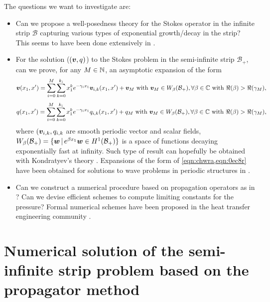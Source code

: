 \documentclass[a4paper,10pt,reqno]{amsart}
\begin{document}
The questions we want to investigate are:   
\begin{itemize}
    \item Can we propose a well-posedness theory for the Stokes operator in the
        infinite strip $\mathcal{B}$ capturing various types of exponential
        growth/decay in the strip? This seems to have been done extensively in
        \cite{nazarov_navier-stokes_2000-1}.    
    \item For the solution ($({\bm v},q)$) to the Stokes problem in the semi-infinite strip
        $\mathcal{B}_+$, can we prove, for any $M\in\mathbb{N}$, an asymptotic expansion of
        the form    
        \begin{equation}
        \label{eqn:chwra}
        {\bm v}(x_1,x')=\sum_{i=0}^{M}\sum_{k=0}^{k_i} x_1^{k}e^{-\gamma_i
        x_1}{\bm v}_{i,k}(x_1,x')+{\bm v}_M \text{ with }{\bm v}_M \in
        W_\beta(\mathcal{B}_+),\forall \beta\in \mathbb{C} \text{ with
        }\Re(\beta)>\Re(\gamma_M),
        \end{equation}
        \begin{equation}
        \label{eqn:0ec8r}
        q(x_1,x')=\sum_{i=0}^{M}\sum_{k=0}^{k_i} x_1^{k}e^{-\gamma_i
        x_1}q_{i,k}(x_1,x')+q_M \text{ with }{\bm v}_M \in
        W_\beta(\mathcal{B}_+),\forall \beta\in \mathbb{C} \text{ with
        }\Re(\beta)>\Re(\gamma_M),
        \end{equation}
        where $({\bm v}_{i,k},q_{i,k}$ are smooth periodic vector and scalar fields,     
        $W_{\beta}(\mathcal{B}_+)=\{ {\bm w}\,|\,e^{\beta x_1}{\bm w} \in
        H^{1}(\mathcal{B}_+)\}$ is a space of functions decaying exponentially fast
        at infinity.
        Such type of result can hopefully be obtained with Kondratyev's theory
        \cite{kozlov_elliptic_1997,nazarov_elliptic_2011}. Expansions of the form of
        \cref{eqn:chwra,eqn:0ec8r} have been obtained for solutions to wave problems
        in periodic structures in
        \cite{hohage_riesz_2013,bourgeois_well-posedness_2018}.
    \item Can we construct a numerical procedure based on propagation operators     
        as in
        \cite{fliss_dirichlet--neumann_2013,fliss_dirichlet--neumann_2021}? Can we
        devise efficient schemes to compute limiting constants for the pressure?    
        Formal numerical schemes have been proposed in the heat transfer engineering
        community \cite{buckinx_macro-scale_2022,vangeffelen_developed_2023}.
\end{itemize}
\section{Numerical solution of the semi-infinite strip problem based on the
propagator method}
    
\end{document}
